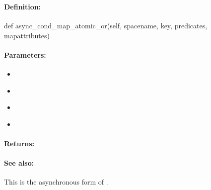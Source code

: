 \pagebreak
\subsubsection{}
\label{api:python:async_cond_map_atomic_or}


\paragraph{Definition:}
\begin{pythoncode}
def async_cond_map_atomic_or(self, spacename, key, predicates, mapattributes)
\end{pythoncode}

\paragraph{Parameters:}
\begin{itemize}[noitemsep]
\item {}\\

\item {}\\

\item {}\\

\item {}\\

\end{itemize}

\paragraph{Returns:}


\paragraph{See also:}  This is the asynchronous form of .

\pagebreak
\subsubsection{}
\label{api:python:map_atomic_xor}


